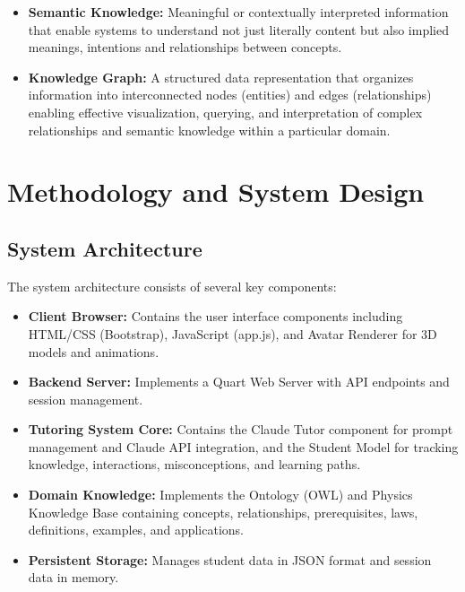 \documentclass[a4paper,11pt,oneside]{article}
\begin{document}
\begin{itemize}
    \item \textbf{Semantic Knowledge:} Meaningful or contextually interpreted information that enable systems to understand not just 
    literally content but also implied meanings, intentions and relationships between concepts.
    
    \item \textbf{Knowledge Graph:} A structured data representation that organizes information into interconnected nodes (entities) 
    and edges (relationships) enabling effective visualization, querying, and interpretation of complex relationships and semantic 
    knowledge within a particular domain.
  \end{itemize}

  \section{Methodology and System Design}

  \subsection{System Architecture}

  The system architecture consists of several key components:

  \begin{itemize}
    \item \textbf{Client Browser:} Contains the user interface components including HTML/CSS (Bootstrap), JavaScript (app.js), 
    and Avatar Renderer for 3D models and animations.
    
    \item \textbf{Backend Server:} Implements a Quart Web Server with API endpoints and session management.
    
    \item \textbf{Tutoring System Core:} Contains the Claude Tutor component for prompt management and Claude API integration, 
    and the Student Model for tracking knowledge, interactions, misconceptions, and learning paths.
    
    \item \textbf{Domain Knowledge:} Implements the Ontology (OWL) and Physics Knowledge Base containing concepts, relationships, 
    prerequisites, laws, definitions, examples, and applications.
    
    \item \textbf{Persistent Storage:} Manages student data in JSON format and session data in memory.
  \end{itemize}
\end{document}
